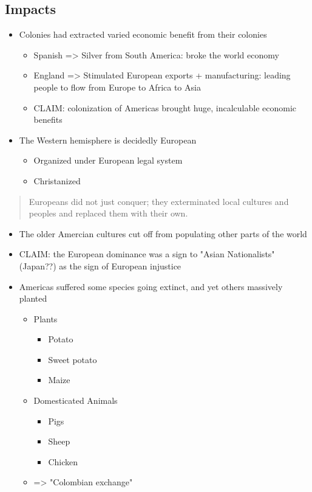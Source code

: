 \documentclass[letterpaper]{article}
\begin{document}
\subsection{Impacts}
\label{sec:orgbd2472d}
\begin{itemize}
\item Colonies had extracted varied economic benefit from their colonies

\begin{itemize}
\item Spanish => Silver from South America: broke the world economy
\item England => Stimulated European exports + manufacturing: leading
people to flow from Europe to Africa to Asia
\item CLAIM: colonization of Americas brought huge, incalculable economic
benefits
\end{itemize}

\item The Western hemisphere is decidedly European

\begin{itemize}
\item Organized under European legal system
\item Christanized
\end{itemize}
\end{itemize}

\begin{quote}
Europeans did not just conquer; they exterminated local cultures and
peoples and replaced them with their own.
\end{quote}

\begin{itemize}
\item The older Amercian cultures cut off from populating other parts of the
world
\item CLAIM: the European dominance was a sign to "Asian Nationalists"
(Japan??) as the sign of European injustice
\item Americas suffered some species going extinct, and yet others massively
planted

\begin{itemize}
\item Plants

\begin{itemize}
\item Potato
\item Sweet potato
\item Maize
\end{itemize}

\item Domesticated Animals

\begin{itemize}
\item Pigs
\item Sheep
\item Chicken
\end{itemize}

\item => "Colombian exchange"
\end{itemize}
\end{itemize}
\end{document}
